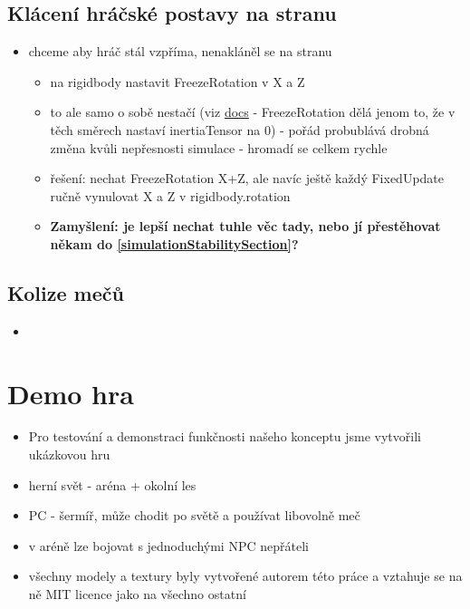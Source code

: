 \subsection{Klácení hráčské postavy na stranu} \label{playerFallingToSideSection}
\begin{itemize}
  \item chceme aby hráč stál vzpříma, nenakláněl se na stranu
        \begin{itemize}
          \item na rigidbody nastavit FreezeRotation v X a Z
          \item to ale samo o sobě nestačí (viz \href{https://docs.unity3d.com/ScriptReference/Rigidbody-constraints.html}{docs} - FreezeRotation dělá jenom to, že v těch směrech nastaví inertiaTensor na 0) - pořád probublává drobná změna kvůli nepřesnosti simulace - hromadí se celkem rychle
          \item řešení: nechat FreezeRotation X+Z, ale navíc ještě každý FixedUpdate ručně vynulovat X a Z v rigidbody.rotation
          \item \textbf{Zamyšlení: je lepší nechat tuhle věc tady, nebo jí přestěhovat někam do \ref{simulationStabilitySection}?}
        \end{itemize}
\end{itemize}

\subsection{Kolize mečů} \label{swordCollisionsSection}
\begin{itemize}
  \item 
\end{itemize}


\section{Demo hra}
\begin{itemize}
  \item Pro testování a demonstraci funkčnosti našeho konceptu jsme vytvořili ukázkovou hru
  \item herní svět - aréna + okolní les
  \item PC - šermíř, může chodit po světě a používat libovolně meč
  \item v aréně lze bojovat s jednoduchými NPC nepřáteli
  \item všechny modely a textury byly vytvořené autorem této práce a vztahuje se na ně MIT licence jako na všechno ostatní
\end{itemize}

